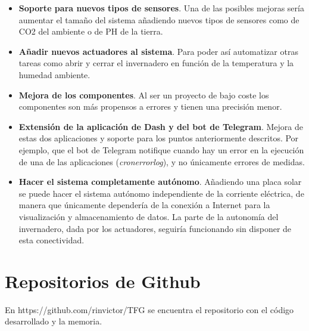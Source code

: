 \documentclass[a4paper, 12pt, oneside]{book}
\begin{document}
\begin{itemize}
\item \textbf{Soporte para nuevos tipos de sensores}. Una de las posibles mejoras sería aumentar el tamaño del sistema añadiendo nuevos tipos de sensores como de CO2 del ambiente o de PH de la tierra.

\item \textbf{Añadir nuevos actuadores al sistema}. Para poder así automatizar otras tareas como abrir y cerrar el invernadero en función de la temperatura y la humedad ambiente.

\item \textbf{Mejora de los componentes}. Al ser un proyecto de bajo coste los componentes son más propensos a errores y tienen una precisión menor.

\item \textbf{Extensión de la aplicación de Dash y del bot de Telegram}. Mejora de estas dos aplicaciones y soporte para los puntos anteriormente descritos. Por ejemplo, que el bot de Telegram notifique cuando hay un error en la ejecución de una de las aplicaciones (\textit{cronerrorlog}), y no únicamente errores de medidas.

\item \textbf{Hacer el sistema completamente autónomo}. Añadiendo una placa solar se puede hacer el sistema autónomo independiente de la corriente eléctrica, de manera que únicamente dependería de la conexión a Internet para la visualización y almacenamiento de datos. La parte de la autonomía del invernadero, dada por los actuadores, seguiría funcionando sin disponer de esta conectividad.
\end{itemize}

\cleardoublepage
\appendix
\chapter{Repositorios de Github}
\label{app:repos}
En https://github.com/rinvictor/TFG se encuentra el repositorio con el código desarrollado y la memoria.


\cleardoublepage
\end{document}
